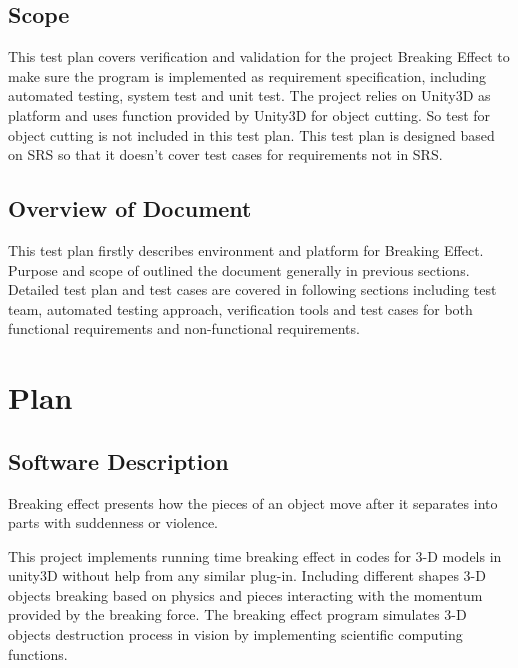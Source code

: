 \documentclass[12pt, titlepage]{article}
\begin{document}
\subsection{Scope}
This test plan covers verification and validation for the project Breaking Effect to make sure the program is implemented as requirement specification, including automated testing, system test and unit test. The project relies on Unity3D as platform and uses function provided by Unity3D for object cutting. So test for object cutting is not included in this test plan. This test plan is designed based on SRS so that it doesn't cover test cases for requirements not in SRS. 


\subsection{Overview of Document}

This test plan firstly describes environment and platform for Breaking Effect. Purpose and scope of outlined the document generally in previous sections. Detailed test plan and test cases are covered in following sections including test team, automated testing approach, verification tools and test cases for both functional requirements and non-functional requirements.

\section{Plan}
	
\subsection{Software Description}

Breaking effect presents how the pieces of an object move after it separates into parts with
suddenness or violence.

This project implements running time breaking effect in codes for 3-D models in unity3D without help from any similar plug-in. Including different shapes 3-D objects breaking based on physics and pieces interacting with the momentum provided by the breaking force. The breaking effect program simulates 3-D objects destruction process in vision by implementing scientific computing functions.

\end{document}
